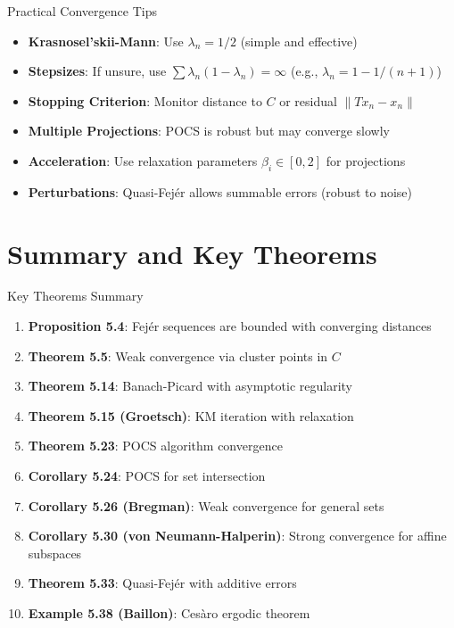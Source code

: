 \documentclass[aspectratio=169,10pt]{beamer}
\begin{document}
\begin{frame}{Practical Convergence Tips}
    \begin{itemize}
        \item \textbf{Krasnosel'skii-Mann}: Use $\lambda_n = 1/2$ (simple and effective)
        \item \textbf{Stepsizes}: If unsure, use $\sum \lambda_n(1-\lambda_n) = \infty$ (e.g., $\lambda_n = 1 - 1/(n+1)$)
        \item \textbf{Stopping Criterion}: Monitor distance to $C$ or residual $\|Tx_n - x_n\|$
        \item \textbf{Multiple Projections}: POCS is robust but may converge slowly
        \item \textbf{Acceleration}: Use relaxation parameters $\beta_i \in [0, 2]$ for projections
        \item \textbf{Perturbations}: Quasi-Fejér allows summable errors (robust to noise)
    \end{itemize}
\end{frame}

\section{Summary and Key Theorems}

\begin{frame}{Key Theorems Summary}
    \begin{enumerate}
        \item \textbf{Proposition 5.4}: Fejér sequences are bounded with converging distances
        \item \textbf{Theorem 5.5}: Weak convergence via cluster points in $C$
        \item \textbf{Theorem 5.14}: Banach-Picard with asymptotic regularity
        \item \textbf{Theorem 5.15 (Groetsch)}: KM iteration with relaxation
        \item \textbf{Theorem 5.23}: POCS algorithm convergence
        \item \textbf{Corollary 5.24}: POCS for set intersection
        \item \textbf{Corollary 5.26 (Bregman)}: Weak convergence for general sets
        \item \textbf{Corollary 5.30 (von Neumann-Halperin)}: Strong convergence for affine subspaces
        \item \textbf{Theorem 5.33}: Quasi-Fejér with additive errors
        \item \textbf{Example 5.38 (Baillon)}: Cesàro ergodic theorem
    \end{enumerate}
\end{frame}
\end{document}
